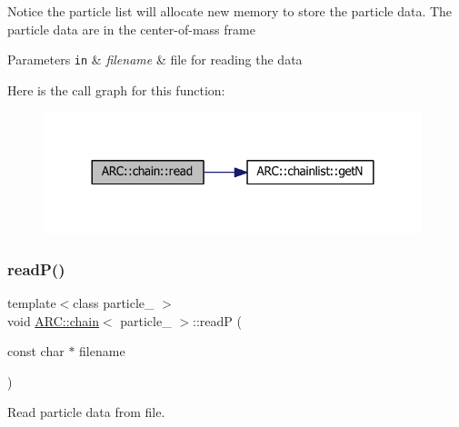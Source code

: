 Notice the particle list will allocate new memory to store the particle data. The particle data are in the center-\/of-\/mass frame 
\begin{DoxyParams}[1]{Parameters}
\mbox{\tt in}  & {\em filename} & file for reading the data \\
\hline
\end{DoxyParams}
Here is the call graph for this function\+:
\nopagebreak
\begin{figure}[H]
\begin{center}
\leavevmode
\includegraphics[width=312pt]{classARC_1_1chain_a3f328bce3650bab9496987bc5a1f5a98_cgraph}
\end{center}
\end{figure}
\hypertarget{classARC_1_1chain_a5325cc6945e9992b431450f7846e91e5}{}\label{classARC_1_1chain_a5325cc6945e9992b431450f7846e91e5} 
\subsubsection{\texorpdfstring{read\+P()}{readP()}}
{\footnotesize\ttfamily template$<$class particle\+\_\+ $>$ \\
void \hyperlink{classARC_1_1chain}{A\+R\+C\+::chain}$<$ particle\+\_\+ $>$\+::readP (\begin{DoxyParamCaption}\item[{const char $\ast$}]{filename }\end{DoxyParamCaption})\hspace{0.3cm}{\ttfamily [inline]}}



Read particle data from file. 

